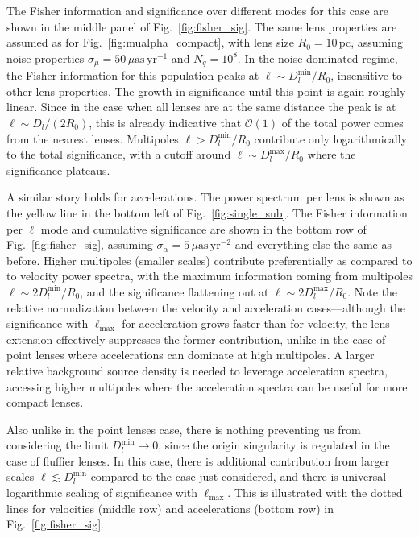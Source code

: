 \documentclass[prd,aps,10pt,nofootinbib,twocolumn,superscriptaddress,preprintnumbers,balancelastpage,longbibliography]{revtex4-1}
\begin{document}
The Fisher information and significance over different modes for this case are shown in the middle panel of Fig.~\ref{fig:fisher_sig}. The same lens properties are assumed as for Fig.~\ref{fig:mualpha_compact}, with lens size $R_0=10$\,pc, assuming noise properties $\sigma_\mu = 50\,\mu\mathrm{as}\,\mathrm{yr}^{-1}$ and $N_q = 10^8$. In the noise-dominated regime, the Fisher information for this population peaks at $\ell \sim D_l^{\mathrm{min}}/R_0$, insensitive to other lens properties. The growth in significance until this point is again roughly linear. Since in the case when all lenses are at the same distance the peak is at $\ell \sim D_l/(2 R_0)$, this is already indicative that $\mathcal{O}(1)$ of the total power comes from the nearest lenses. Multipoles $\ell > D_l^{\mathrm{min}}/R_0$ contribute only logarithmically to the total significance, with a cutoff around $\ell \sim D_l^{\mathrm{max}}/R_0$ where the significance plateaus. 

A similar story holds for accelerations. The power spectrum per lens is shown as the yellow line in the bottom left of Fig.~\ref{fig:single_sub}. The Fisher information per $\ell$ mode and cumulative significance are shown in the bottom row of Fig.~\ref{fig:fisher_sig}, assuming $\sigma_\alpha = 5\,\mu\mathrm{as}\,\mathrm{yr}^{-2}$ and everything else the same as before. Higher multipoles (smaller scales) contribute preferentially as compared to to velocity power spectra, with the maximum information coming from multipoles $\ell \sim 2D_l^{\mathrm{min}}/R_0$, and the significance flattening out at $\ell \sim 2D_l^{\mathrm{max}}/R_0$. Note the relative normalization between the velocity and acceleration cases---although the significance with $\ell_\mathrm{max}$ for acceleration grows faster than for velocity, the lens extension effectively suppresses the former contribution, unlike in the case of point lenses where accelerations can dominate at high multipoles. A larger relative background source density is needed to leverage acceleration spectra, accessing higher multipoles where the acceleration spectra can be useful for more compact lenses.


Also unlike in the point lenses case, there is nothing preventing us from considering the limit $D_l^\mathrm{min}\rightarrow0$, since the origin singularity is regulated in the case of fluffier lenses. In this case, there is additional contribution from larger scales $\ell\lesssim D_l^\mathrm{min}$ compared to the case just considered, and there is universal logarithmic scaling of significance with $\ell_\mathrm{max}$. This is illustrated with the dotted lines for velocities (middle row) and accelerations (bottom row) in Fig.~\ref{fig:fisher_sig}.
\end{document}
